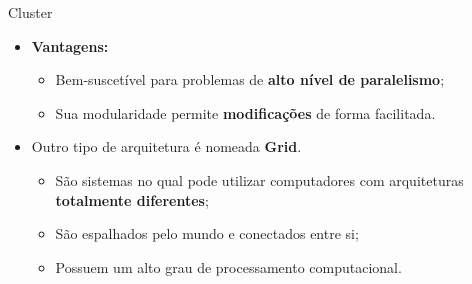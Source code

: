 \begin{frame}{Cluster}
    \begin{itemize}
%
%
		\item \textbf{Vantagens:}
		\begin{itemize}
			\item Bem-suscetível para problemas de \textbf{alto nível de paralelismo};
			\item Sua modularidade permite \textbf{modificações} de forma facilitada. 
		\end{itemize}

			\bigskip

		\item Outro tipo de arquitetura é nomeada \textbf{Grid}.
		\begin{itemize}
			\item São sistemas no qual pode utilizar computadores com arquiteturas \textbf{totalmente diferentes};
			\item São espalhados pelo mundo e conectados entre si;
			\item Possuem um alto grau de processamento computacional.
		\end{itemize}

	\end{itemize}

\end{frame}








